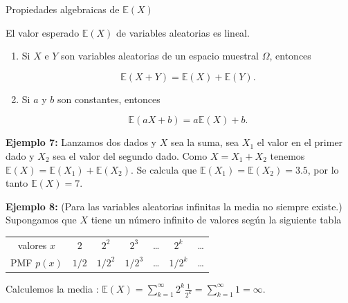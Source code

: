\documentclass[10pt]{beamer}
\begin{document}
\begin{frame}{Propiedades algebraicas de $\mathbb{E}(X)$}
\small{El valor esperado $\mathbb{E}(X)$ de variables aleatorias  es lineal.
	
\begin{enumerate}
	\item Si $X$ e $Y$ son variables aleatorias de un espacio muestral $\Omega$, entonces
	
	\[
	\mathbb{E}(X + Y) = \mathbb{E}(X) + \mathbb{E}(Y).
	\]
\item Si $a$ y $b$ son constantes, entonces

\[
\mathbb{E}(aX + b) = a\mathbb{E}(X) + b.
\]
\end{enumerate}	


\vspace{0.3cm}

\scriptsize{
	
\textbf{Ejemplo 7:} Lanzamos dos dados y $X$ sea la suma, sea $X_1$ el valor en el primer dado y $X_2$ sea el valor del segundo dado. Como $X = X_1 + X_2$ tenemos $\mathbb{E}(X) = \mathbb{E}(X_1) + \mathbb{E}(X_2)$. Se calcula que $\mathbb{E}(X_1) = \mathbb{E}(X_2) = 3.5$, por lo tanto $\mathbb{E}(X) = 7$.

\textbf{Ejemplo 8:} (Para las variables aleatorias infinitas la media no siempre existe.) Supongamos que $X$ tiene un n\'umero infinito de valores seg\'un la siguiente tabla

\begin{table}[]
	\centering
	\begin{tabular}{ccccccc}
		valores $x$   & $2$   & $2^2$   & $2^3$   & \dots   & $2^k$   & \dots   \\
		PMF $p(x)$ & $1/2$ & $1/2^2$ & $1/2^3$ & \dots & $1/2^k$ & \dots
	\end{tabular}
\end{table}

Calculemos la media : $\displaystyle \mathbb{E}(X) = \sum_{k =1}^{\infty}2^k\frac{1}{2^k} = \sum_{k =1}^{\infty}1 = \infty.$
}
	
}

\end{frame}
\end{document}
